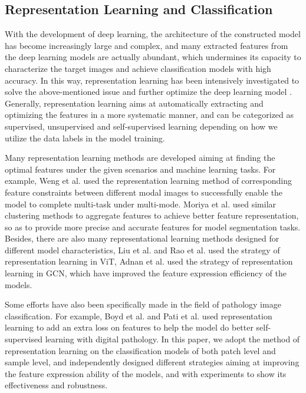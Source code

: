 \subsection{Representation Learning and Classification}
With the development of deep learning, the architecture of the constructed model has become increasingly large and complex, and many extracted features from the deep learning models are actually abundant, which undermines its capacity to characterize the target images and achieve classification models with high accuracy. In this way, representation learning has been intensively investigated to solve the above-mentioned issue and further optimize the deep learning model \cite{bengio2013representation}. Generally, representation learning aims at automatically extracting and optimizing the features in a more systematic manner, and can be categorized as supervised, unsupervised and self-supervised learning depending on how we utilize the data labels in the model training. 

Many representation learning methods are developed aiming at finding the optimal features under the given scenarios and machine learning tasks. For example, Weng et al. \cite{weng2019multimodal} used the representation learning method of corresponding feature constraints between different modal images to successfully enable the model to complete multi-task under multi-mode. Moriya et al. \cite{moriya2018unsupervised}used similar clustering methods to aggregate features to achieve better feature representation, so as to provide more precise and accurate features for model segmentation tasks. Besides, there are also many representational learning methods designed for different model characteristics, Liu et al. \cite{liu2021swin} and Rao et al. \cite{rao2021dynamicvit} used the strategy of representation learning in ViT\cite{dosovitskiy2020image}, Adnan et al. \cite{adnan2020representation} used the strategy of representation learning in GCN, which have improved the feature expression efficiency of the models. 
 
Some efforts have also been specifically made in the field of pathology image classification. For example, Boyd et al.\cite{boyd2021self} and Pati et al. \cite{pati2021reducing} used representation learning to add an extra loss on features to help the model do better self-supervised learning with digital pathology. In this paper, we adopt the method of representation learning on the classification models of both patch level and sample level, and independently designed different strategies aiming at improving the feature expression ability of the models, and with experiments to show its effectiveness and robustness.